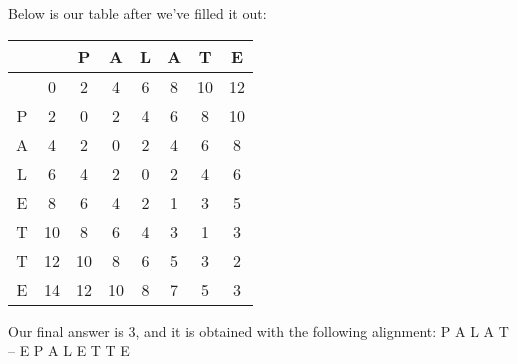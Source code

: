 \documentclass[11pt]{article}
\begin{document}
\section{} %
Below is our table after we've filled it out:
\begin{center}
\renewcommand{\arraystretch}{1.6}
\begin{tabular}{| c |c |c |c |c |c |c | c |}
	\hline
	  &   & P & A & L & A & T & E \\ \hline
	  & 0 & 2 & 4 & 6 & 8 & 10 & 12 \\ \hline
	P & 2 & 0 & 2 & 4 & 6 & 8 & 10 \\ \hline
	A & 4 & 2 & 0 & 2 & 4 & 6 & 8 \\ \hline
	L & 6 & 4 & 2 & 0 & 2 & 4 & 6 \\ \hline
	E & 8 & 6 & 4 & 2 & 1 & 3 & 5 \\ \hline
	T & 10 & 8 & 6 & 4 & 3 & 1 & 3 \\ \hline
	T & 12 & 10 & 8 & 6 & 5 & 3 & 2 \\ \hline
	E & 14 & 12 & 10 & 8 & 7 & 5 & 3 \\ \hline
\end{tabular}
\end{center}
Our final answer is 3, and it is obtained with the following alignment:
\newline
P A L A T -- E
\newline
P A L E T T E
\end{document}
